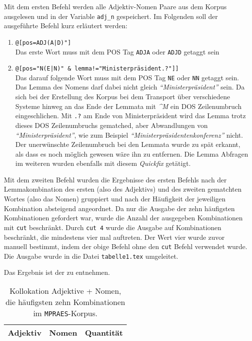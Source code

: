 \documentclass[%
	type=document,%
  	style=article,%
  	media=print,
  	pages=oneside,%
  	prefixLecturer=Dozenten:,
  	author=multiple,
]{unihildesheim} %
\begin{document}
Mit dem ersten Befehl werden alle Adjektiv-Nomen Paare aus dem Korpus ausgelesen
und in der Variable \texttt{adj\_n} gespeichert. Im Folgenden soll der
ausgeführte Befehl kurz erläutert werden:
\begin{enumerate}
  \item \texttt{@[pos=\dq ADJ(A|D)"]} \\
			Das erste Wort muss mit dem POS Tag \texttt{ADJA} oder \texttt{ADJD} getaggt
			sein
  \item \texttt{@[pos="N(E|N)" \& lemma!="Ministerpräsident.?"]]} \\
			Das darauf folgende Wort muss mit dem POS Tag \texttt{NE} oder \texttt{NN}
			getaggt sein. Das Lemma des Nomens darf dabei nicht gleich
			\textit{"`Ministerpräsident"'} sein. Da sich bei der Erstellung des Korpus bei dem
			Transport über verschiedene Systeme hinweg an das Ende der Lemmata mit
			\textit{\textasciicircum M} ein DOS Zeilenumbruch eingeschlichen. Mit
			\texttt{.?} am Ende von Ministerpräsident wird das Lemma trotz dieses DOS
			Zeilenumbruchs gematched, aber Abwandlungen von \textit{"`Ministerpräsident"'}, wie zum
			Beispiel \textit{"`Ministerpräsidentenkonferenz"'} nicht. Der unerwünschte
			Zeilenumbruch bei den Lemmata wurde zu spät erkannt, als dass es noch
			möglich gewesen wäre ihn zu entfernen. Die Lemma Abfragen im weiteren wurden
			ebenfalls mit diesem \textit{Quickfix} getätigt.
\end{enumerate}

Mit dem zweiten Befehl wurden die Ergebnisse des ersten Befehls nach der
Lemmakombination des ersten (also des Adjektivs) und des zweiten gematchten
Wortes (also das Nomen) gruppiert und nach der Häufigkeit der jeweiligen
Kombination absteigend angeordnet. Da nur die Ausgabe der zehn häufigsten
Kombinationen gefordert war, wurde die Anzahl der ausgegeben Kombinationen
mit \texttt{cut} beschränkt. Durch \texttt{cut 4} wurde die Ausgabe auf
Kombinationen beschränkt, die mindestens vier mal auftreten. Der Wert vier wurde zuvor manuell
bestimmt, indem der obige Befehl ohne den \texttt{cut} Befehl verwendet wurde.
Die Ausgabe wurde in die Datei \texttt{tabelle1.tex} umgeleitet.

Das Ergebnis ist der  zu entnehmen.

\begin{table}[htpb]\label{t}
	\center
	\begin{tabularx}{0.6\textwidth}{llr}
		\toprule
		\textbf{Adjektiv} & \textbf{Nomen} & \textbf{Quantität}\\
		\midrule
		
		\bottomrule
	\end{tabularx}
	\caption{Kollokation Adjektive + Nomen, die häufigsten zehn Kombinationen im
	\texttt{MPRAES}-Korpus.}
	\label{tab:adjektive_nomina}
\end{table}
\end{document}
